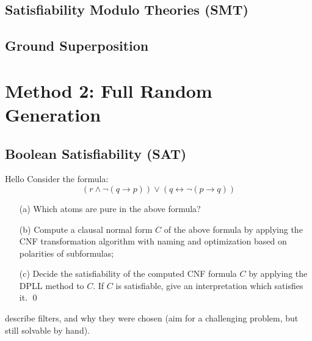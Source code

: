 \documentclass[12pt]{llncs}
\begin{document}
\subsection{Satisfiability Modulo Theories (SMT)}





\subsection{Ground Superposition}






\section{Method 2: Full Random Generation}



\subsection{Boolean Satisfiability (SAT)}

\begin{mdframed}
\begin{example}[SAT]
    Hello
Consider the formula:
\[
( r \land \lnot ( q \rightarrow p ) ) \lor ( q \leftrightarrow \lnot ( p \rightarrow q ) )
\]
\begin{itemize}
\item[(a)]
Which atoms are pure in the above formula?
\item[(b)] Compute a clausal normal form $C$ of the above formula by
  applying the CNF transformation algorithm with naming and
  optimization based on polarities of subformulas;
\item[(c)] Decide the satisfiability of the computed CNF formula $C$
  by applying  the DPLL method to $C$. If $C$ is
satisfiable,  give an interpretation which
satisfies it.
    \qed
\end{itemize}
\end{example}
\end{mdframed}

describe filters, and why they were chosen (aim for a challenging problem, but still solvable by hand).
\end{document}
